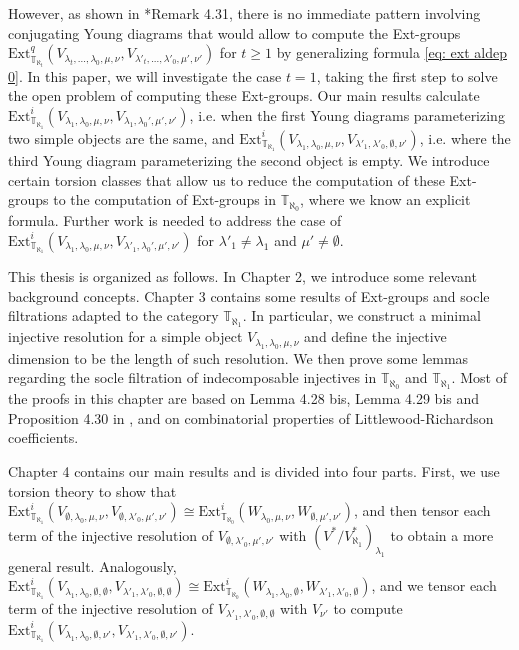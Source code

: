 \documentclass[openany, a4paper]{amsbook}
\theoremstyle{definition}
\numberwithin{equation}{chapter}
\newcommand{\T}[1]{{\mathbb{T}}_{\aleph_{#1}}}
\newcommand{\Ext}[4]{\mathrm{Ext}^{#1}_{#2}({#3}, {#4})}
\begin{document}
However, as shown in \cite{cp17}*{Remark 4.31}, there is no immediate pattern involving conjugating Young diagrams that would allow to compute the Ext-groups $\Ext{q}{\T{t}}{V_{\lambda_t, ... , \lambda_0, \mu, \nu}}{V_{\lambda'_t, ... , \lambda'_0, \mu', \nu'}}$ for $t \geq 1$ by generalizing formula \eqref{eq: ext aldep 0}. In this paper, we will investigate the case $t=1$, taking the first step to solve the open problem of computing these Ext-groups. Our main results calculate $\Ext{i}{\T{1}}{V_{\lambda_1, \lambda_0, \mu, \nu}}{V_{\lambda_1, \lambda_0', \mu', \nu'}}$, i.e. when the first Young diagrams parameterizing two simple objects are the same, and $\Ext{i}{\T{1}}{V_{\lambda_1, \lambda_0, \mu, \nu}}{V_{\lambda'_1, \lambda'_0, \emptyset, \nu'}}$, i.e. where the third Young diagram parameterizing the second object is empty. We introduce certain torsion classes that allow us to reduce the computation of these Ext-groups to the computation of Ext-groups in $\T{0}$, where we know an explicit formula. Further work is needed to address the case of $\Ext{i}{\T{1}}{V_{\lambda_1, \lambda_0, \mu, \nu}}{V_{\lambda'_1, \lambda_0', \mu', \nu'}}$ for $\lambda'_1 \neq \lambda_1$ and $\mu' \neq \emptyset$.

This thesis is organized as follows. In Chapter 2, we introduce some relevant background concepts. Chapter 3 contains some results of Ext-groups and socle filtrations adapted to the category $\T{1}$. In particular, we construct a minimal injective resolution for a simple object $V_{\lambda_1, \lambda_0, \mu, \nu}$ and define the injective dimension to be the length of such resolution. 
We then prove some lemmas regarding the socle filtration of indecomposable injectives in $\T{0}$ and $\T{1}$. Most of the proofs in this chapter are based on Lemma 4.28 bis, Lemma 4.29 bis and Proposition 4.30 in \cite{cp17}, and on combinatorial properties of Littlewood-Richardson coefficients. 

Chapter 4 contains our main results and is divided into four parts. First, we use torsion theory to show that $\Ext{i}{\T{1}}{V_{\emptyset, \lambda_0, \mu, \nu}}{V_{\emptyset, \lambda'_0, \mu', \nu'}} \cong \Ext{i}{\T{0}}{W_{\lambda_0, \mu, \nu}}{W_{\emptyset, \mu', \nu'}}$, and then tensor each term of the injective resolution of $V_{\emptyset, \lambda'_0, \mu', \nu'}$ with $(V^\ast/V^\ast_{\aleph_1})_{\lambda_1}$ to obtain a more general result. Analogously, $\Ext{i}{\T{1}}{V_{\lambda_1, \lambda_0, \emptyset, \emptyset}}{V_{\lambda'_1, \lambda'_0, \emptyset, \emptyset}} \cong \Ext{i}{\T{0}}{W_{\lambda_1, \lambda_0, \emptyset}}{W_{\lambda'_1, \lambda'_0, \emptyset}}$, and we tensor each term of the injective resolution of $V_{\lambda'_1, \lambda'_0, \emptyset, \emptyset}$ with $V_{\nu'}$ to compute $\Ext{i}{\T{1}}{V_{\lambda_1, \lambda_0, \emptyset, \nu'}}{V_{\lambda'_1, \lambda'_0, \emptyset, \nu'}}$.
\end{document}
